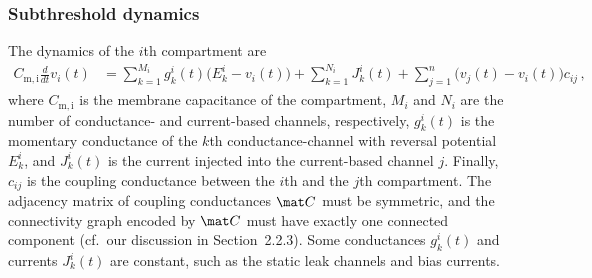 \subsubsection{Subthreshold dynamics}
The dynamics of the $i$th compartment are
\begin{align}
	C_\mathrm{m, i} \frac{d}{dt} v_i(t) &=
		\sum_{k=1}^{M_i} g_k^i(t) \bigl( E_k^i - v_i(t) \bigr) +
		\sum_{k=1}^{N_i} J_k^i(t) +
		\sum_{j=1}^{n} \bigl(v_j(t) - v_i(t)\bigr) c_{ij} \,,
\label{eqn:nlif_single_compartment}
\end{align}
where $C_\mathrm{m, i}$ is the membrane capacitance of the compartment, $M_i$ and $N_i$ are the number of conductance- and current-based channels, respectively, $g_{k}^i(t)$ is the momentary conductance of the $k$th conductance-channel with reversal potential $E_{k}^i$, and $J_{k}^i(t)$ is the current injected into the current-based channel $j$.
Finally, $c_{ij}$ is the coupling conductance between the $i$th and the $j$th compartment.
The adjacency matrix of coupling conductances $\mat C$ must be symmetric, and the connectivity graph encoded by $\mat C$ must have exactly one connected component (cf.~our discussion in Section~2.2.3).
Some conductances $g_{k}^i(t)$ and currents $J_{k}^i(t)$ are constant, such as the static leak channels and bias currents.


